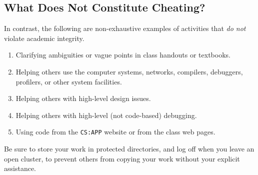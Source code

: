 \subsection{What Does Not Constitute Cheating?}

In contrast, the following are non-exhaustive examples of activities
that \emph{do not} violate academic integrity.

\begin{enumerate}
\item Clarifying ambiguities or vague points in class handouts or textbooks.
\item Helping others use the computer systems, networks, compilers, debuggers,
  profilers, or other system facilities.
\item Helping others with high-level design issues.
\item Helping others with high-level (not code-based) debugging.
\item Using code from the \texttt{CS:APP} website or from the class web pages.
\end{enumerate}

Be sure to store your work in protected directories,
and log off when you leave an open cluster,
to prevent others from copying your work
without your explicit assistance.
